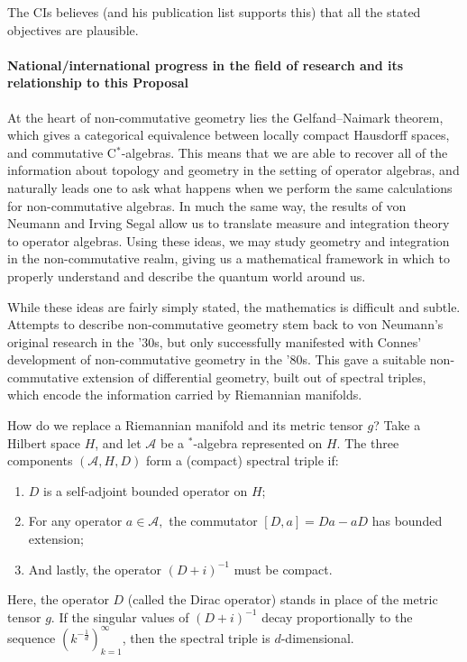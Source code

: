 \documentclass[12pt]{article}
\begin{document}
The CIs believes (and his publication list supports this) that all the stated objectives are plausible.


\paragraph*{National/international progress in the field of research and its relationship to this Proposal}

At the heart of non-commutative geometry lies the Gelfand--Naimark theorem,
which gives a categorical equivalence between locally compact Hausdorff spaces,
and commutative C$^{\ast}$-algebras. This means that we are able to recover all of the information about topology and geometry in the setting of operator algebras, and naturally leads one to ask what happens when we perform the same calculations for non-commutative algebras. In much the same way, the results of von Neumann and Irving Segal allow us to translate measure and integration theory to operator algebras.
Using these ideas, we may study geometry and integration in the non-commutative realm, giving us a mathematical framework in which to properly understand and describe the quantum world around us.

While these ideas are fairly simply stated, the mathematics is difficult and
subtle. Attempts to describe non-commutative geometry stem back to von Neumann's
original research in the '30s, but only successfully manifested with Connes'
development of non-commutative geometry in the '80s. This gave a suitable non-commutative extension of differential geometry, built out of spectral triples, which encode the information carried by Riemannian manifolds.

How do we replace a Riemannian manifold and its metric tensor $g$? Take a Hilbert space $H$, and let $\mathcal{A}$ be a $^{\ast}$-algebra represented on $H.$ The three components $(\mathcal{A},H,D)$ form a (compact) spectral triple if:
\begin{enumerate}
\item $D$ is a self-adjoint bounded operator on $H$;
\item For any operator $a\in\mathcal{A},$ the commutator $[D,a]=Da-aD$ has bounded extension;
\item And lastly, the operator $(D+i)^{-1}$ must be compact.
\end{enumerate}
Here, the operator $D$ (called the Dirac operator) stands in place of the metric
tensor $g.$ If the singular values of $(D+i)^{-1}$ decay proportionally to the sequence $(k^{-\frac{1}{d}})_{k=1}^{\infty}$, then the spectral triple is $d$-dimensional.
\end{document}
